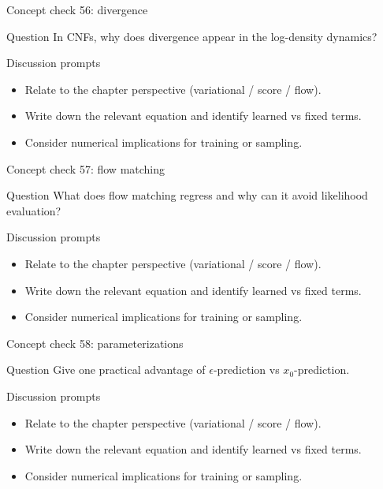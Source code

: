 \documentclass[aspectratio=169]{beamer}
\begin{document}
\begin{frame}{Concept check 56: divergence}
\begin{block}{Question}
In CNFs, why does divergence appear in the log-density dynamics?
\end{block}
\begin{block}{Discussion prompts}
\begin{itemize}
\item Relate to the chapter perspective (variational / score / flow).
\item Write down the relevant equation and identify learned vs fixed terms.
\item Consider numerical implications for training or sampling.
\end{itemize}
\end{block}
\end{frame}

\begin{frame}{Concept check 57: flow matching}
\begin{block}{Question}
What does flow matching regress and why can it avoid likelihood evaluation?
\end{block}
\begin{block}{Discussion prompts}
\begin{itemize}
\item Relate to the chapter perspective (variational / score / flow).
\item Write down the relevant equation and identify learned vs fixed terms.
\item Consider numerical implications for training or sampling.
\end{itemize}
\end{block}
\end{frame}

\begin{frame}{Concept check 58: parameterizations}
\begin{block}{Question}
Give one practical advantage of \(\epsilon\)-prediction vs \(x_0\)-prediction.
\end{block}
\begin{block}{Discussion prompts}
\begin{itemize}
\item Relate to the chapter perspective (variational / score / flow).
\item Write down the relevant equation and identify learned vs fixed terms.
\item Consider numerical implications for training or sampling.
\end{itemize}
\end{block}
\end{frame}
\end{document}
